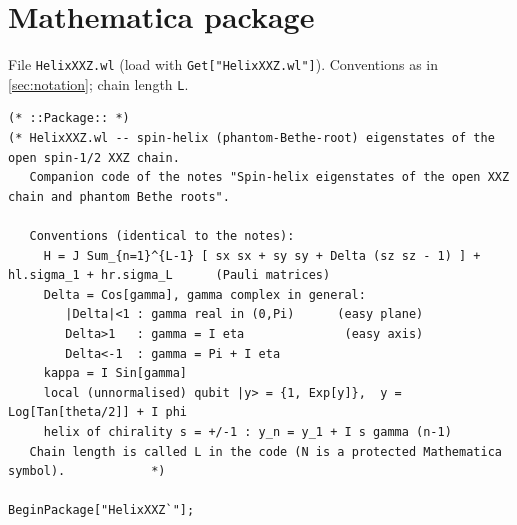 \documentclass[11pt,a4paper]{article}
\theoremstyle{definition}
\begin{document}
\section{Mathematica package}\label{app:code}
File \texttt{HelixXXZ.wl} (load with \texttt{Get["HelixXXZ.wl"]}). Conventions as in \cref{sec:notation}; chain length \texttt{L}.
\begin{lstlisting}
(* ::Package:: *)
(* HelixXXZ.wl -- spin-helix (phantom-Bethe-root) eigenstates of the open spin-1/2 XXZ chain.
   Companion code of the notes "Spin-helix eigenstates of the open XXZ chain and phantom Bethe roots".

   Conventions (identical to the notes):
     H = J Sum_{n=1}^{L-1} [ sx sx + sy sy + Delta (sz sz - 1) ] + hl.sigma_1 + hr.sigma_L      (Pauli matrices)
     Delta = Cos[gamma], gamma complex in general:
        |Delta|<1 : gamma real in (0,Pi)      (easy plane)
        Delta>1   : gamma = I eta              (easy axis)
        Delta<-1  : gamma = Pi + I eta
     kappa = I Sin[gamma]
     local (unnormalised) qubit |y> = {1, Exp[y]},  y = Log[Tan[theta/2]] + I phi
     helix of chirality s = +/-1 : y_n = y_1 + I s gamma (n-1)
   Chain length is called L in the code (N is a protected Mathematica symbol).            *)

BeginPackage["HelixXXZ`"];


\end{lstlisting}
\end{document}
